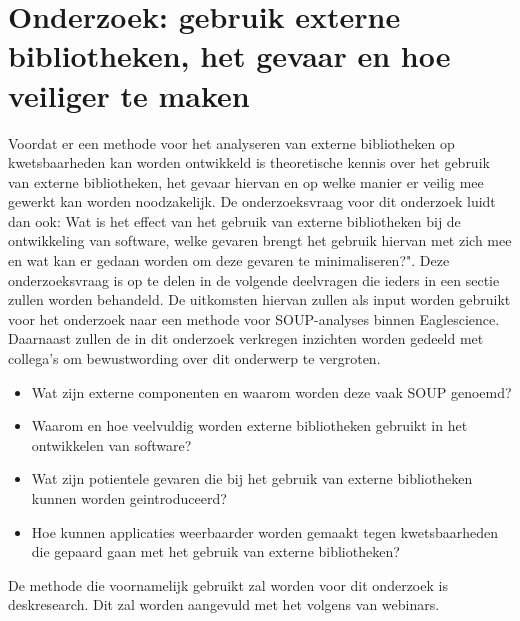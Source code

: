 \chapter{Onderzoek: gebruik externe bibliotheken, het gevaar en hoe veiliger te maken}\label{ch:externeBibliothekengebruikGevaren}
Voordat er een methode voor het analyseren van externe bibliotheken op kwetsbaarheden kan worden ontwikkeld is theoretische kennis over het gebruik van externe bibliotheken, het gevaar hiervan en op welke manier er veilig mee gewerkt kan worden noodzakelijk. De onderzoeksvraag voor dit onderzoek luidt dan ook: Wat is het effect van het gebruik van externe bibliotheken bij de ontwikkeling van software, welke gevaren brengt het gebruik hiervan met zich mee en wat kan er gedaan worden om deze gevaren te minimaliseren?". Deze onderzoeksvraag is op te delen in de volgende deelvragen die ieders in een sectie zullen worden behandeld. De uitkomsten hiervan zullen als input worden gebruikt voor het onderzoek naar een methode voor SOUP-analyses binnen Eaglescience. Daarnaast zullen de in dit onderzoek verkregen inzichten worden gedeeld met collega's om bewustwording over dit onderwerp te vergroten.

\begin{itemize}
    \item Wat zijn externe componenten en waarom worden deze vaak SOUP genoemd?
    \item Waarom en hoe veelvuldig worden externe bibliotheken gebruikt in het ontwikkelen van software?
    \item Wat zijn potientele gevaren die bij het gebruik van externe bibliotheken kunnen worden geintroduceerd?
    \item Hoe kunnen applicaties weerbaarder worden gemaakt tegen kwetsbaarheden die gepaard gaan met het gebruik van externe bibliotheken?
\end{itemize}
De methode die voornamelijk gebruikt zal worden voor dit onderzoek is deskresearch. Dit zal worden aangevuld met het volgens van webinars.

